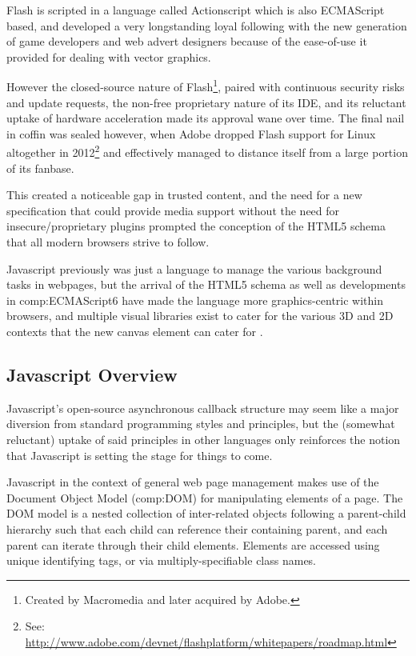 Flash is scripted in a language called Actionscript which is also ECMAScript based, and developed a very longstanding loyal following with the new generation of game developers and web advert designers because of the ease-of-use it provided for dealing with vector graphics.

However the closed-source nature of Flash\footnote{Created by Macromedia and later acquired by Adobe.}, paired with continuous security risks and update requests, the non-free proprietary nature of its IDE, and its reluctant uptake of hardware acceleration made its approval wane over time. The final nail in coffin was sealed however, when Adobe dropped Flash support for Linux altogether in 2012\footnote{See: \url{http://www.adobe.com/devnet/flashplatform/whitepapers/roadmap.html}} and effectively managed to distance itself from a large portion of its fanbase. 

This created a noticeable gap in trusted content, and the need for a new specification that could provide media support without the need for insecure/proprietary plugins prompted the conception of the HTML5 schema that all modern browsers strive to follow.

Javascript previously was just a language to manage the various background tasks in webpages, but the arrival of the HTML5 schema as well as developments in \gls{comp:ECMAScript6} have made the language more graphics-centric within browsers, and multiple visual libraries exist to cater for the various 3D and 2D contexts that the new canvas element can cater for \cite{ecmascript2011ecmascript}. 


\subsection{Javascript Overview}\label{ref:haplo:javaover}

Javascript's open-source asynchronous callback structure may seem like a major diversion from standard programming styles and principles, but the (somewhat reluctant) uptake of said principles in other languages only reinforces the notion that Javascript is setting the stage for things to come.

Javascript in the context of general web page management makes use of the Document Object Model (\gls{comp:DOM}) for manipulating elements of a page. The DOM model is a nested collection of inter-related objects following a parent-child hierarchy such that each child can reference their containing parent, and each parent can iterate through their child elements. Elements are accessed using unique identifying tags, or via multiply-specifiable class names.

